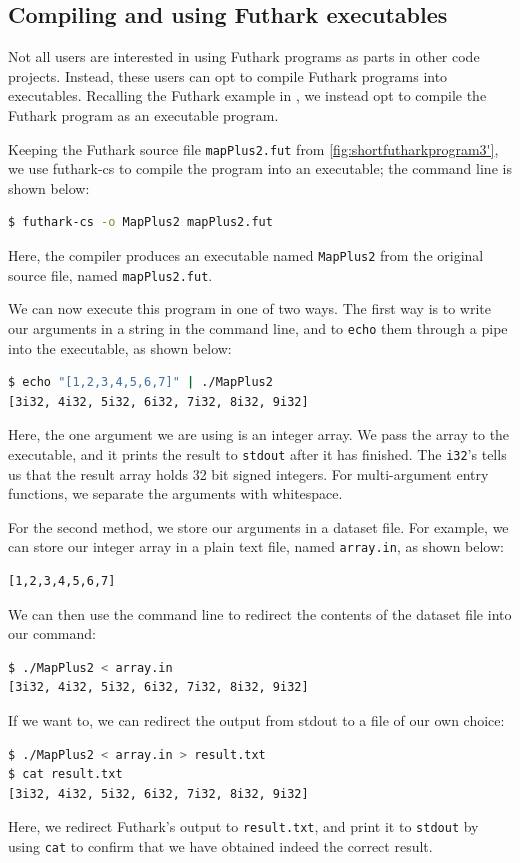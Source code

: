 \subsection{Compiling and using Futhark \csharp{} executables}
\label{subsec:futharkcsexe}
Not all users are interested in using Futhark programs as parts in other code
projects. Instead, these users can opt to compile Futhark programs into
executables. Recalling the Futhark example in
,
we instead opt to compile the Futhark program as an executable program.

Keeping the Futhark source file \texttt{mapPlus2.fut} from
\ref{fig:shortfutharkprogram3'}, we use futhark-cs to compile the program into
an executable; the command line is shown below: %
  \begin{lstlisting}[language=sh]
$ futhark-cs -o MapPlus2 mapPlus2.fut
  \end{lstlisting}
%
Here, the compiler produces an executable named \texttt{MapPlus2} from the
original source file, named {\tt mapPlus2.fut}.

We can now execute this program in one of two ways.
The first way is to write our arguments in a string in the command line, and
to \texttt{echo} them through a pipe into the executable, as shown below:
  \begin{lstlisting}[language=sh]
$ echo "[1,2,3,4,5,6,7]" | ./MapPlus2
[3i32, 4i32, 5i32, 6i32, 7i32, 8i32, 9i32]
  \end{lstlisting}
Here, the one argument we are using is 
an integer array. We pass the array to the executable, and it prints the result
to \texttt{stdout} after it has finished. The \texttt{i32}'s tells us that the
result array holds 32 bit signed integers.
For multi-argument entry functions, we separate the arguments with whitespace.

For the second method, we store our arguments in a dataset file. For example, we
can store our integer array in a plain text file, named {\tt array.in}, 
as shown below: %
  \begin{lstlisting}
[1,2,3,4,5,6,7]
  \end{lstlisting}
We can then use the command line to redirect the contents of the dataset file
into our command:
  \begin{lstlisting}[language=sh]
$ ./MapPlus2 < array.in
[3i32, 4i32, 5i32, 6i32, 7i32, 8i32, 9i32]
  \end{lstlisting}
If we want to, we can redirect the output from stdout to a file of our own
choice: %
  \begin{lstlisting}[language=sh]
$ ./MapPlus2 < array.in > result.txt
$ cat result.txt
[3i32, 4i32, 5i32, 6i32, 7i32, 8i32, 9i32]
  \end{lstlisting}
Here, we redirect Futhark's output to \texttt{result.txt}, and print it to 
\texttt{stdout} by using \texttt{cat} to confirm that we have obtained indeed 
the correct result.

